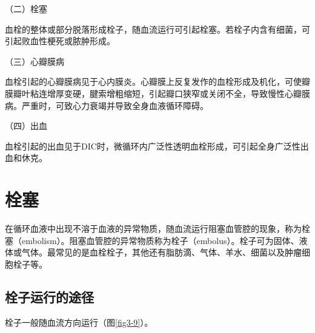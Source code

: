 {（二）栓塞}

血栓的整体或部分脱落形成栓子，随血流运行可引起栓塞。若栓子内含有细菌，可引起败血性梗死或脓肿形成。

{（三）心瓣膜病}

血栓引起的心瓣膜病见于心内膜炎。心瓣膜上反复发作的血栓形成及机化，可使瓣膜瓣叶粘连增厚变硬，腱索增粗缩短，引起瓣口狭窄或关闭不全，导致慢性心瓣膜病。严重时，可致心力衰竭并导致全身血液循环障碍。

{（四）出血}

血栓引起的出血见于DIC时，微循环内广泛性透明血栓形成，可引起全身广泛性出血和休克。

\section{栓塞}

在循环血液中出现不溶于血液的异常物质，随血流运行阻塞血管腔的现象，称为栓塞（embolism）。阻塞血管腔的异常物质称为栓子（embolus）。栓子可为固体、液体或气体。最常见的是血栓栓子，其他还有脂肪滴、气体、羊水、细菌以及肿瘤细胞栓子等。

\subsection{栓子运行的途径}

栓子一般随血流方向运行（图\ref{fig3-9}）。

